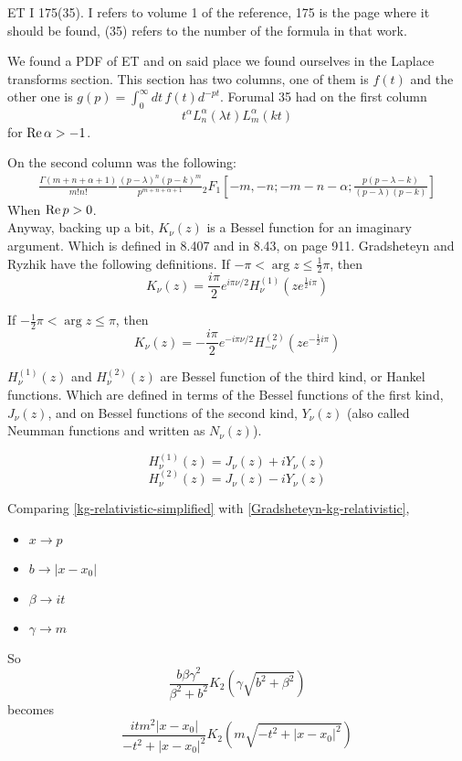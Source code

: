 ET I 175(35).
I refers to volume 1 of the reference, 175 is the page where it should be found, (35) refers to the number of the formula
in that work.

We found a PDF of ET and on said place we found ourselves in the Laplace transforms section.
This section has two columns, one of them is $f(t)$ and the other one is $g(p) = \int_{0}^{\infty} dt\, f(t) d^{-pt}$.
Forumal 35 had on the first column
$$
t^\alpha L_{n}^{\alpha} (\lambda t) L_{m}^{\alpha} (k t)
$$
for $\operatorname{Re}{\alpha} > -1$.

On the second column was the following:
\begin{align*}
\frac{\Gamma(m+n+\alpha + 1)}{m! n!}
\frac{(p-\lambda)^n (p-k)^m}{p^{m+n+\alpha +1}}
{}_{2}F_{1} \left[ -m, -n; -m-n-\alpha; \frac{p(p-\lambda -k)}{(p-\lambda)(p-k)} \right]
\end{align*}
When $\operatorname{Re}{p} > 0$.
\\

Anyway, backing up a bit, $K_\nu (z)$ is a Bessel function for an imaginary argument.
Which is defined in 8.407 and in 8.43, on page 911.
Gradsheteyn and Ryzhik have the following definitions.
If $-\pi < \arg{z} \leq \frac{1}{2}\pi$, then
$$
K_\nu (z) = \frac{i\pi}{2} e^{i\pi\nu /2} H_{\nu}^{(1)} \left(z e^{\frac{1}{2} i\pi} \right)
$$

If $-\frac{1}{2}\pi < \arg{z} \leq \pi$, then
$$
K_\nu (z) = -\frac{i\pi}{2} e^{-i\pi\nu /2} H_{-\nu}^{(2)} \left(z e^{-\frac{1}{2} i\pi} \right)
$$

$H_{\nu}^{(1)} (z)$ and $H_{\nu}^{(2)} (z)$ are Bessel function of the third kind, or Hankel functions.
Which are defined in terms of the Bessel functions of the first kind, $J_{\nu}(z)$, and on Bessel functions
of the second kind, $Y_\nu (z)$ (also called Neumman functions and written as $N_\nu (z)$).

$$
H_{\nu}^{(1)} (z) = J_\nu (z) + i Y_\nu (z)
$$
$$
H_{\nu}^{(2)} (z) = J_\nu (z) - i Y_\nu (z)
$$

Comparing \ref{kg-relativistic-simplified} with \ref{Gradsheteyn-kg-relativistic},
\begin{itemize}
    \item $x \rightarrow p$
    \item $b \rightarrow |x-x_0|$
    \item $\beta \rightarrow it$
    \item $\gamma \rightarrow m$
\end{itemize}

So
$$
\frac{b \beta \gamma^2}{\beta^2 + b^2} K_2\left(\gamma \sqrt{b^2 + \beta^2}\right)
$$
becomes
$$
\frac{it m^2 |x-x_0| }{-t^2 + |x-x_0|^2} K_2\left(m \sqrt{ -t^2 + |x-x_0|^2}\right)
$$

